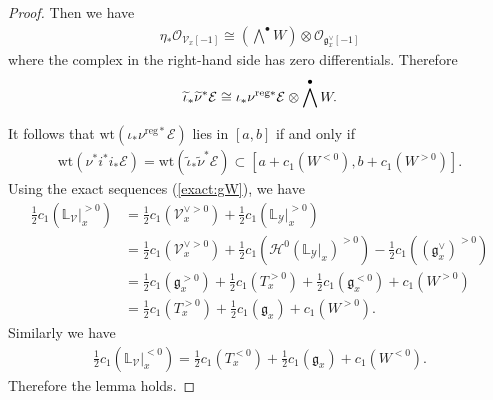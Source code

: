 \documentclass [11pt,oneside,a4paper,mathscr]{amsart}
\theoremstyle{definition}
\newcommand{\wt}{\mathrm{wt}}
\begin{document}
\begin{proof}
Then we have 
\begin{align*}
    \eta_{\ast}\mathcal{O}_{\mathcal{V}_x[-1]}
    \cong \left(\bigwedge^{\bullet}W\right) \otimes 
    \mathcal{O}_{\mathfrak{g}_x^{\vee}[-1]}
\end{align*}
where the complex in the right-hand side has 
zero differentials. 
Therefore 
\begin{align}\notag
    \widetilde{\iota}_{\ast}\widetilde{\nu}^{\ast}\mathcal{E}
    \cong \iota_{\ast}\nu^{\mathrm{reg}\ast}\mathcal{E} \otimes\bigwedge^{\bullet}W.
\end{align}

It follows that 
$\wt(\iota_{\ast}\nu^{\mathrm{reg}\ast}\mathcal{E})$
lies in $[a, b]$ if and only if 
\begin{align*}
\wt(\nu^{\ast}i^{\ast}i_{\ast}\mathcal{E})=
\wt(\widetilde{\iota}_{\ast}\widetilde{\nu}^{\ast}\mathcal{E})
\subset [a+c_1 (W^{<0}), b+c_1 (W^{>0})].
\end{align*}
Using the exact sequences (\ref{exact:gW}), we have 
\begin{align*}
    \frac{1}{2} c_1 (\mathbb{L}_{\mathcal{V}}|_{x}^{>0}) &=\frac{1}{2} c_1(\mathcal{V}_x^{\vee >0})+
    \frac{1}{2}c_1(\mathbb{L}_{\mathcal{Y}}|_{x}^{>0}) \\
    &=\frac{1}{2} c_1(\mathcal{V}_x^{\vee>0})+
    \frac{1}{2}c_1(\mathcal{H}^0(\mathbb{L}_{\mathcal{Y}}|_{x})^{>0})
    -\frac{1}{2} c_1((\mathfrak{g}_x^{\vee})^{>0}) \\
    &=\frac{1}{2}c_1(\mathfrak{g}_x^{>0})+\frac{1}{2}c_1(T_x^{>0})+\frac{1}{2}c_1(\mathfrak{g}_x^{<0})
    +c_1 (W^{>0}) \\
    &=\frac{1}{2}c_1(T_x^{>0})+\frac{1}{2}c_1(\mathfrak{g}_x)+c_1 (W^{>0}). 
\end{align*}
Similarly we have 
\begin{align*}
 \frac{1}{2} c_1 (\mathbb{L}_{\mathcal{V}}|_{x}^{<0})
 =\frac{1}{2}c_1(T_x^{<0})+\frac{1}{2}c_1(\mathfrak{g}_x)+c_1 (W^{<0}).
\end{align*}
Therefore the lemma holds. 
\end{proof}
\end{document}
